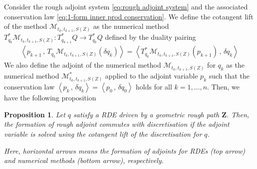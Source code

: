 \documentclass[11pt, oneside]{article}
\numberwithin{equation}{section}
\newtheorem{proposition}[lemma]{Proposition}
\theoremstyle{definition}
\newcommand{\mc}[1]{\mathcal{#1}}
\newcommand{\mcal}[1]{\mc{#1}}
\newcommand{\scp}[2]{{\left\langle {#1}\, , \, {#2}\right\rangle}}
\def\p{{\partial}}
\def\p{\partial}
\begin{document}
Consider the rough adjoint system \eqref{eq:rough adjoint system} and the associated conservation law \eqref{eq:1-form inner prod conservation}. We define the cotangent lift of the method $\mcal{M}_{t_k, t_{k+1}, S(Z)}$ as the numerical method $T_{q_k}^*\mcal{M}_{t_k, t_{k+1}, S(Z)} : T_{q_{k+1}}^*Q \rightarrow T_{q_k}^*Q$ defined by the duality pairing
\begin{align*}
    \scp{p_{k+1}}{T_{q_k}\mcal{M}_{t_k, t_{k+1}, S(Z)}(\delta q_k)} = \scp{T^*_{q_k}\mcal{M}_{t_k, t_{k+1}, S(Z)}(p_{k+1})}{\delta q_k}
\end{align*}
We also define the adjoint of the numerical method $\mcal{M}_{t_k, t_{k+1}, S(Z)}$ for $q_k$ as the numerical method $\mcal{M}^*_{t_k, t_{k+1}, S(Z)}$ applied to the adjoint variable $p_k$ such that the conservation law $\scp{p_k}{\delta q_k} = \scp{p_0}{\delta q_0}$ holds for all $k=1,\ldots,n$.
Then, we have the following proposition
\begin{proposition}\label{prop:cotangent general}
    Let $q$ satisfy a RDE driven by a geometric rough path $\mathbf{Z}$. Then, the formation of rough adjoint commutes with discretisation if the adjoint variable is solved using the cotangent lift of the discretisation for $q$.
\begin{center}
\end{center}
Here, horizontal arrows means the formation of adjoints for RDEs (top arrow) and numerical methods (bottom arrow), respectively. 
\end{proposition}
\end{document}
